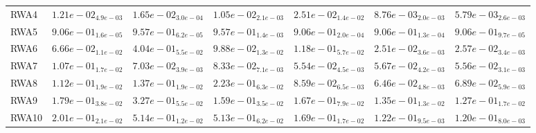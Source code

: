 \documentclass{article}
\begin{document}
\begin{table}
\begin{scriptsize}
\begin{tabular}{lllllll}
RWA4 & $  1.21e-02_{ 4.9e-03}$ & $  1.65e-02_{ 3.0e-04}$ & $  1.05e-02_{ 2.1e-03}$ & $  2.51e-02_{ 1.4e-02}$ & \cellcolor{gray25}$  8.76e-03_{ 2.0e-03}$ & \cellcolor{gray95}$  5.79e-03_{ 2.6e-03}$ \\
RWA5 & \cellcolor{gray95}$  9.06e-01_{ 1.6e-05}$ & $  9.57e-01_{ 6.2e-05}$ & $  9.57e-01_{ 1.4e-03}$ & $  9.06e-01_{ 2.0e-04}$ & $  9.06e-01_{ 1.3e-04}$ & \cellcolor{gray25}$  9.06e-01_{ 9.7e-05}$ \\
RWA6 & $  6.66e-02_{ 1.1e-02}$ & $  4.04e-01_{ 5.5e-02}$ & $  9.88e-02_{ 1.3e-02}$ & $  1.18e-01_{ 5.7e-02}$ & \cellcolor{gray95}$  2.51e-02_{ 3.6e-03}$ & \cellcolor{gray25}$  2.57e-02_{ 3.4e-03}$ \\
RWA7 & $  1.07e-01_{ 1.7e-02}$ & $  7.03e-02_{ 3.9e-03}$ & $  8.33e-02_{ 7.1e-03}$ & \cellcolor{gray95}$  5.54e-02_{ 4.5e-03}$ & $  5.67e-02_{ 4.2e-03}$ & \cellcolor{gray25}$  5.56e-02_{ 3.1e-03}$ \\
RWA8 & $  1.12e-01_{ 1.9e-02}$ & $  1.37e-01_{ 1.9e-02}$ & $  2.23e-01_{ 6.3e-02}$ & $  8.59e-02_{ 6.5e-03}$ & \cellcolor{gray95}$  6.46e-02_{ 4.8e-03}$ & \cellcolor{gray25}$  6.89e-02_{ 5.9e-03}$ \\
RWA9 & $  1.79e-01_{ 3.8e-02}$ & $  3.27e-01_{ 5.5e-02}$ & $  1.59e-01_{ 3.5e-02}$ & $  1.67e-01_{ 7.9e-02}$ & \cellcolor{gray25}$  1.35e-01_{ 1.3e-02}$ & \cellcolor{gray95}$  1.27e-01_{ 1.7e-02}$ \\
RWA10 & $  2.01e-01_{ 2.1e-02}$ & $  5.14e-01_{ 1.2e-02}$ & $  5.13e-01_{ 6.2e-02}$ & $  1.69e-01_{ 1.7e-02}$ & \cellcolor{gray25}$  1.22e-01_{ 9.5e-03}$ & \cellcolor{gray95}$  1.20e-01_{ 8.0e-03}$ \\
\hline
\end{tabular}
\end{scriptsize}
\end{table}
\end{document}
